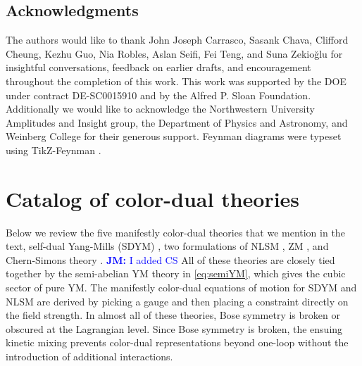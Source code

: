 \documentclass[11pt,letter]{article}
\newcommand{\jm}[1]{\textcolor{blue}{\textbf{JM: }{#1}}}
\begin{document}
\subsection*{Acknowledgments}
The authors would like to thank John Joseph Carrasco, Sasank Chava, Clifford Cheung, Kezhu Guo, Nia Robles, Aslan Seifi, Fei Teng, and Suna Zekio\u{g}lu for insightful conversations,
feedback on earlier drafts, and encouragement throughout the completion of
this work. This work was supported by the DOE under contract
DE-SC0015910 and by the Alfred P. Sloan
Foundation. Additionally we would like to acknowledge the Northwestern
University Amplitudes and Insight group, the Department of Physics and
Astronomy, and Weinberg College for their generous support.  Feynman
diagrams were typeset using TikZ-Feynman \cite{Ellis:2016jkw}.

\appendix
{}
\section{Catalog of color-dual theories}
\label{sec:CKLagrangians}

Below we review the five manifestly color-dual theories that we mention in
the text, self-dual Yang-Mills (SDYM) \cite{Monteiro2011pc}, two formulations of NLSM \cite{Cheung:2016prv,Cheung:2020djz,Cheung:2021zvb}, ZM \cite{Zakharov:1973pp, Cheung:2022mix}, and Chern-Simons theory \cite{Ben-Shahar:2021zww}.  \jm{I added CS} All
of these theories are closely tied together by the semi-abelian YM
theory in \cref{eq:semiYM}, which gives the cubic sector of pure YM.
The manifestly color-dual equations of motion for SDYM and NLSM are
derived by picking a gauge and then placing a constraint directly on the
field strength. In almost all of these
theories, Bose symmetry is broken or obscured at the Lagrangian level.
Since Bose symmetry is broken, the ensuing kinetic mixing prevents color-dual representations beyond one-loop without the introduction of additional interactions.
\end{document}
